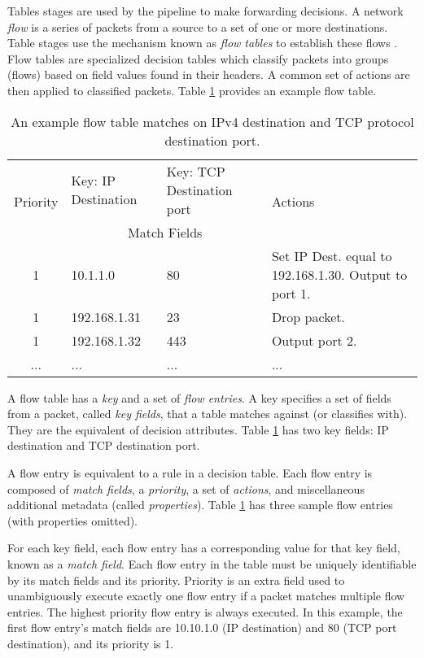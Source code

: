 Tables stages are used by the pipeline to make forwarding decisions.
A network \emph{flow} is a series of packets from a source to a set of one or
more destinations.
Table stages use the mechanism known as \emph{flow tables} to establish these
flows \cite{openflow_spec}. 
Flow tables are specialized decision tables which classify packets into
groups (flows) based on field values found in their headers. 
A common set of actions are then applied to classified packets.
Table \ref{tbl:flow_table} provides an example flow table.

\begin{table}[ht]
\caption{An example flow table matches on IPv4 destination and TCP protocol
destination port.}
\label{tbl:flow_table}
\centering
\begin{tabularx}{\linewidth}{| c | X | X | X |}
\hline
\multirow{2}{*}{Priority} & Key: IP Destination & Key: TCP Destination port  &
\multirow{2}{*}{Actions} \\
\cline{2-3}
  & \multicolumn{2}{|c|}{Match Fields} & \\
\hline
\hline
1 & 10.1.1.0 & 80 & Set IP Dest. equal to 192.168.1.30. Output to port 1. \\
\hline
1 & 192.168.1.31 & 23 & Drop packet. \\
\hline
1 & 192.168.1.32 & 443 & Output port 2. \\
\hline
... & ... & ... & ... \\
\hline
\end{tabularx}
\end{table}


A flow table has a \emph{key} and a set of \emph{flow entries}. A
key specifies a set of fields from a packet, called \emph{key fields}, that a table matches
against (or classifies with). They are the equivalent of decision attributes.
Table \ref{tbl:flow_table} has two key fields: IP destination and TCP
destination port.

A flow entry is equivalent to a rule in a decision table. Each flow entry is
composed of \emph{match fields}, a \emph{priority}, a set of
\emph{actions}, and miscellaneous additional metadata (called
\emph{properties}). Table \ref{tbl:flow_table} has three sample flow entries
(with properties omitted).

For each key field, each flow entry has a corresponding value for that
key field, known as a
\emph{match field}. Each flow entry in the table must be uniquely
identifiable by its match fields and its priority.
Priority is an extra field used to
unambiguously execute exactly one flow entry if a packet matches
multiple flow entries.
The highest priority flow entry is always executed.
In this example, the first flow entry's match fields are
10.10.1.0 (IP destination) and 80 (TCP port destination), and its priority is 1.

